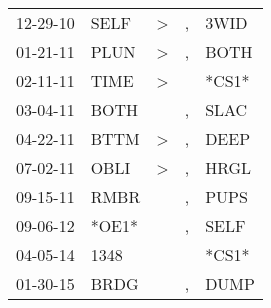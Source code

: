 \begin{supertabular}{p{0.07\textwidth}p{0.06\textwidth}p{0.02\textwidth}p{0.02\textwidth}p{0.06\textwidth}}
 12-29-10\textsuperscript{} &  SELF\textsuperscript{} &  \textgreater &  , &  3WID\textsuperscript{} \\
 01-21-11\textsuperscript{} &  PLUN\textsuperscript{} &  \textgreater &  , &  BOTH\textsuperscript{} \\
 02-11-11\textsuperscript{} &  TIME\textsuperscript{} &  \textgreater &    &                   *CS1* \\
 03-04-11\textsuperscript{} &  BOTH\textsuperscript{} &               &  , &  SLAC\textsuperscript{} \\
 04-22-11\textsuperscript{} &  BTTM\textsuperscript{} &  \textgreater &  , &  DEEP\textsuperscript{} \\
 07-02-11\textsuperscript{} &  OBLI\textsuperscript{} &  \textgreater &  , &  HRGL\textsuperscript{} \\
 09-15-11\textsuperscript{} &  RMBR\textsuperscript{} &               &  , &  PUPS\textsuperscript{} \\
 09-06-12\textsuperscript{} &                   *OE1* &               &  , &  SELF\textsuperscript{} \\
 04-05-14\textsuperscript{} &  1348\textsuperscript{} &               &    &                   *CS1* \\
 01-30-15\textsuperscript{} &  BRDG\textsuperscript{} &               &  , &  DUMP\textsuperscript{} \\
\end{supertabular}
